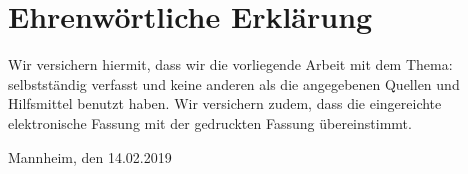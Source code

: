 
\clearpage
\chapter*{Ehrenwörtliche Erklärung}

Wir versichern hiermit, dass wir die vorliegende Arbeit
 mit dem Thema: \textit{\DerTitelDerArbeit} selbstständig verfasst und keine anderen als die angegebenen Quellen und
Hilfsmittel benutzt haben. Wir versichern zudem,
dass die eingereichte elektronische Fassung mit der gedruckten Fassung übereinstimmt.

\vspace{2cm}
Mannheim, den 14.02.2019

\vspace{10mm}
\authorSG
\hfill \authorRF
\hfill \authorGP

\vspace{5mm}
\hfill \authorEJ
\hfill \authorNL
\hfill